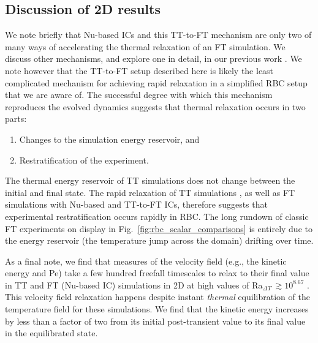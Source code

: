 \documentclass[aps, pre, onecolumn, nofootinbib, notitlepage, groupedaddress, amsfonts, amssymb, amsmath, longbibliography, superscriptaddress]{revtex4-1}
\newcommand{\ea}[1]{{\color{red} #1}}
\begin{document}
\subsection{\ea{Discussion of 2D results}} We note briefly that \ea{Nu-based ICs and} this TT-to-FT mechanism \ea{are} only \ea{two} of many ways of accelerating the thermal relaxation of an FT simulation.
We discuss other mechanisms, and explore one in detail, in our previous work \cite{anders&all2018}.
We note however that the TT-to-FT setup described here is likely the least complicated mechanism for achieving rapid relaxation in a simplified RBC setup that we are aware of.
The successful degree with which this mechanism reproduces the evolved dynamics suggests that thermal relaxation occurs in two parts:
\begin{enumerate}
\item Changes to the simulation energy reservoir, and
\item Restratification of the experiment.
\end{enumerate}
The thermal energy reservoir of TT simulations does not change between the initial and final state.
The rapid relaxation of TT simulations\ea{, as well as FT simulations with Nu-based and TT-to-FT ICs}, therefore suggests that experimental restratification occurs rapidly in RBC. 
The long rundown of \ea{classic} FT experiments on display in Fig.~\ref{fig:rbc_scalar_comparisons} is entirely due to the energy reservoir (the temperature jump across the domain) drifting over time.

\ea{
As a final note, we find that measures of the velocity field (e.g., the kinetic energy and Pe) take a few hundred freefall timescales to relax to their final value in TT and FT (Nu-based IC) simulations in 2D at high values of Ra$_{\Delta T}\,\gtrsim 10^{8.67}$ .
This velocity field relaxation happens despite instant \emph{thermal} equilibration of the temperature field for these simulations.
We find that the kinetic energy increases by less than a factor of two from its initial post-transient value to its final value in the equilibrated state.
}
\end{document}
